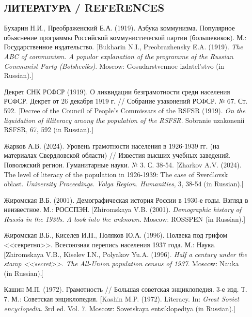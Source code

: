 \documentclass[12pt]{article}
\begin{document}
\begin{singlespace}\small
\section*{ЛИТЕРАТУРА / REFERENCES}
\begin{list}{}{\setlength{\leftmargin}{1.5em}\setlength{\itemindent}{-1.5em}\setlength{\itemsep}{2pt}\setlength{\parsep}{0pt}}
\item Бухарин Н.И., Преображенский Е.А. (1919). Азбука коммунизма. Популярное объяснение программы Российской коммунистической партии (большевиков). М.: Государственное издательство. [Bukharin N.I., Preobrazhensky E.A. (1919). \textit{The ABC of communism. A popular explanation of the programme of the Russian Communist Party (Bolsheviks)}. Moscow: Gosudarstvennoe izdatel'stvo (in Russian).]
\item Декрет СНК РСФСР (1919). О ликвидации безграмотности среди населения РСФСР. Декрет от 26 декабря 1919 г. // Собрание узаконений РСФСР. № 67. Ст. 592. [Decree of the Council of People's Commissars of the RSFSR (1919). \textit{On the liquidation of illiteracy among the population of the RSFSR}. Sobranie uzakonenii RSFSR, 67, 592 (in Russian).]
\item Жарков А.В. (2024). Уровень грамотности населения в 1926-1939 гг. (на материалах Свердловской области) // Известия высших учебных заведений. Поволжский регион. Гуманитарные науки. № 3. С. 38-54. [Zharkov A.V. (2024). The level of literacy of the population in 1926-1939: The case of Sverdlovsk oblast. \textit{University Proceedings. Volga Region. Humanities}, 3, 38-54 (in Russian).]
\item Жиромская В.Б. (2001). Демографическая история России в 1930-е годы. Взгляд в неизвестное. М.: РОССПЭН. [Zhiromskaya V.B. (2001). \textit{Demographic history of Russia in the 1930s. A look into the unknown}. Moscow: ROSSPEN (in Russian).]
\item Жиромская В.Б., Киселев И.Н., Поляков Ю.А. (1996). Полвека под грифом <<секретно>>. Всесоюзная перепись населения 1937 года. М.: Наука. [Zhiromskaya V.B., Kiselev I.N., Polyakov Yu.A. (1996). \textit{Half a century under the stamp <<secret>>. The All-Union population census of 1937}. Moscow: Nauka (in Russian).]
\item Кашин М.П. (1972). Грамотность // Большая советская энциклопедия. 3-е изд. Т. 7. М.: Советская энциклопедия. [Kashin M.P. (1972). Literacy. In: \textit{Great Soviet encyclopedia}. 3rd ed. Vol. 7. Moscow: Sovetskaya entsiklopediya (in Russian).]

\end{list}
\end{singlespace}
\end{document}
